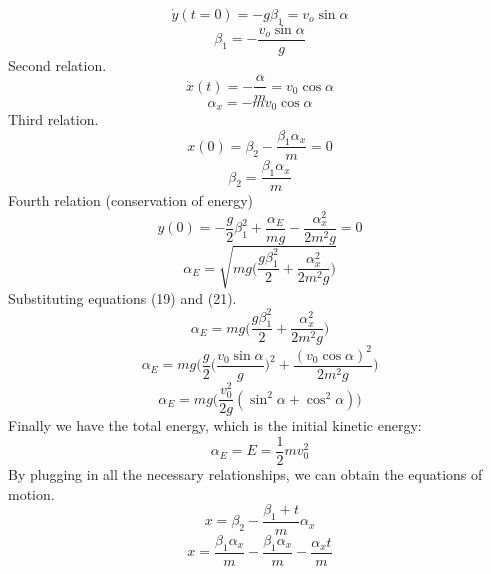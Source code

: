 \documentclass[11pt,a4paper]{report}
\begin{document}
\begin{equation}
\dot{y}(t=0) = -g\beta_1 = v_o\sin\alpha
\end{equation}
\begin{equation}
\beta_1 = -\dfrac{v_o\sin\alpha}{g}
\end{equation}
Second relation.
\begin{equation}
\dot{x}(t) = -\dfrac{\alpha}{m} = v_0\cos\alpha
\end{equation}
\begin{equation}
\alpha_x = -mv_0\cos\alpha
\end{equation}
Third relation.
\begin{equation}
x(0) = \beta_2 - \dfrac{\beta_1\alpha_x}{m}=0
\end{equation}
\begin{equation}
\beta_2 = \dfrac{\beta_1\alpha_x}{m}
\end{equation}
Fourth relation (conservation of energy)
\begin{equation}
y(0) = -\dfrac{g}{2}\beta_1^2+\dfrac{\alpha_E}{mg}-\dfrac{\alpha_x^2}{2m^2g}=0
\end{equation}
\begin{equation}
\alpha_E = \sqrt{mg\Big(\dfrac{g\beta_1^2}{2}+\dfrac{\alpha_x^2}{2m^2g}\Big)}
\end{equation}
Substituting equations (19) and (21).
\begin{equation}
\alpha_E = mg\Big(\dfrac{g\beta_1^2}{2}+\dfrac{\alpha_x^2}{2m^2g}\Big)
\end{equation}
\begin{equation}
\alpha_E = mg\Big(\dfrac{g}{2}\Big(\dfrac{v_0\sin\alpha}{g}\Big)^2+\dfrac{(v_0\cos\alpha)^2}{2m^2g}\Big)
\end{equation}
\begin{equation}
\alpha_E = mg\Big(\dfrac{v_0^2}{2g}(\sin^2\alpha+\cos^2\alpha)\Big)
\end{equation}
Finally we have the total energy, which is the initial kinetic energy:
\begin{equation}
\alpha_E = E = \dfrac{1}{2}mv_0^2
\end{equation}
By plugging in all the necessary relationships, we can obtain the equations of motion.
\begin{equation}
x = \beta_2 - \dfrac{\beta_1+t}{m}\alpha_x
\end{equation}
\begin{equation}
x = \dfrac{\beta_1\alpha_x}{m} - \dfrac{\beta_1\alpha_x}{m}-\dfrac{\alpha_x t}{m}
\end{equation}
\end{document}
